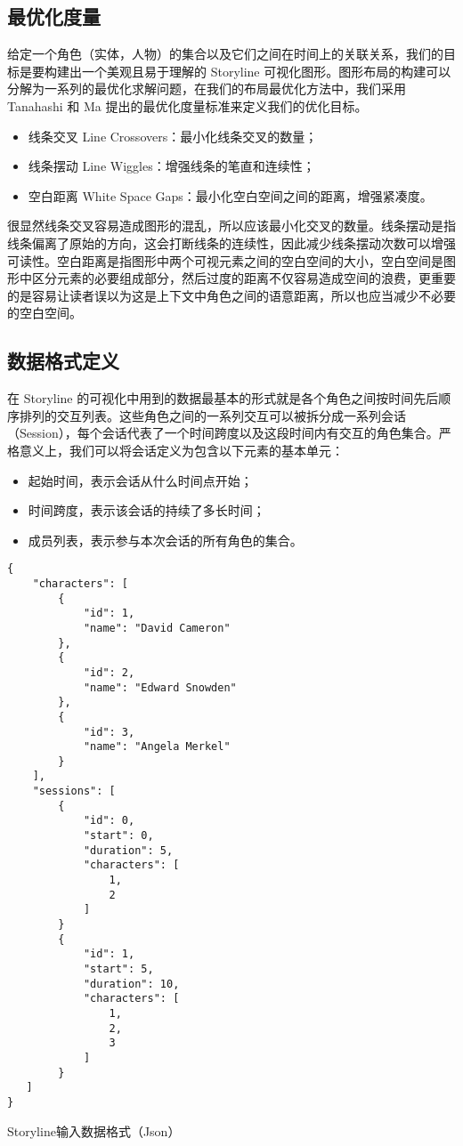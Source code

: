 \subsection{最优化度量}
\label{metrics}
给定一个角色（实体，人物）的集合以及它们之间在时间上的关联关系，我们的目标是要构建出一个美观且易于理解的 Storyline 可视化图形。图形布局的构建可以分解为一系列的最优化求解问题，在我们的布局最优化方法中，我们采用 Tanahashi 和 Ma \cite{tanahashi2012design} 提出的最优化度量标准来定义我们的优化目标。
\begin{itemize}
\item 线条交叉 Line Crossovers：最小化线条交叉的数量；
\item 线条摆动 Line Wiggles：增强线条的笔直和连续性；
\item 空白距离 White Space Gaps：最小化空白空间之间的距离，增强紧凑度。
\end{itemize}
很显然线条交叉容易造成图形的混乱，所以应该最小化交叉的数量。线条摆动是指线条偏离了原始的方向，这会打断线条的连续性，因此减少线条摆动次数可以增强可读性。空白距离是指图形中两个可视元素之间的空白空间的大小，空白空间是图形中区分元素的必要组成部分，然后过度的距离不仅容易造成空间的浪费，更重要的是容易让读者误以为这是上下文中角色之间的语意距离，所以也应当减少不必要的空白空间。

\subsection{数据格式定义}
在 Storyline 的可视化中用到的数据最基本的形式就是各个角色之间按时间先后顺序排列的交互列表。这些角色之间的一系列交互可以被拆分成一系列会话（Session），每个会话代表了一个时间跨度以及这段时间内有交互的角色集合。严格意义上，我们可以将会话定义为包含以下元素的基本单元：
\begin{itemize}
\item 起始时间，表示会话从什么时间点开始；
\item 时间跨度，表示该会话的持续了多长时间；
\item 成员列表，表示参与本次会话的所有角色的集合。
\end{itemize}
\begin{listing}[!htb]
\linespread{0.6}
\begin{verbatim}
{
    "characters": [
        {
            "id": 1,
            "name": "David Cameron"
        },
        {
            "id": 2,
            "name": "Edward Snowden"
        },
        {
            "id": 3,
            "name": "Angela Merkel"
        }
    ],
    "sessions": [
        {
            "id": 0,
            "start": 0,
            "duration": 5,
            "characters": [
                1,
                2
            ]
        }
        {
            "id": 1,
            "start": 5,
            "duration": 10,
            "characters": [
                1,
                2,
                3
            ]
        }
   ]
}
\end{verbatim}
\caption{Storyline输入数据格式（Json）} 
\label{list:json-sample}
\end{listing}

